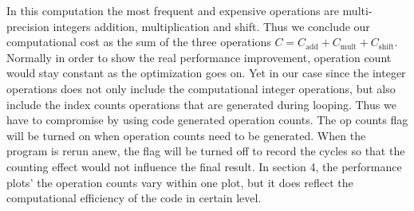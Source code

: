 In this computation the most frequent and expensive operations are multi-precision integers addition, multiplication and shift. Thus we conclude our computational cost as the sum of the three operations $C = C_{\text{add}} + C_{\text{mult}} + C_{\text{shift}}$. 
Normally in order to show the real performance improvement, operation count would stay constant as the optimization goes on. Yet in our case since the integer operations does not only include the computational integer operations, but also include the index counts operations that are generated during looping. Thus we have to compromise by using code generated operation counts. The op counts flag will be turned on when operation counts need to be generated. When the program is rerun anew, the flag will be turned off to record the cycles so that the counting effect would not influence the final result. In section 4, the performance plots' the operation counts vary within one plot, but it does reflect the computational efficiency of the code in certain level. 